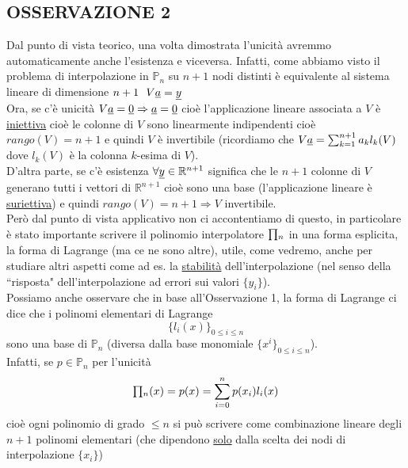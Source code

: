 \subsection{OSSERVAZIONE 2}
Dal punto di vista teorico, una volta dimostrata l'unicità avremmo automaticamente
anche l'esistenza e viceversa. Infatti, come abbiamo visto il problema di interpolazione in $\mathbb{P}_n$ su $n+1$ nodi distinti è equivalente al sistema lineare di dimensione $n+1 \ \ V\uline{a} = \uline{y}$\\
Ora, se c'è unicità $V\uline{a} = \uline{0} \Rightarrow \uline{a} = \uline{0}$ cioè l'applicazione lineare associata a $V$ è \uline{iniettiva} cioè le colonne di $V$ sono linearmente indipendenti cioè $rango(V)=n+1$ e quindi $V$ è invertibile (ricordiamo che $V \uline{a} = \sum_{k=1}^{n+1} a_k l_k(V)$ dove $l_k(V)$ è la colonna $k$-esima di $V$).\\
D'altra parte, se c'è esistenza $\forall \uline{y} \in \mathbb{R}^{n+1}$ significa che le $n+1$ colonne di $V$ generano tutti i vettori di $\mathbb{R}^{n+1}$ cioè sono una base (l'applicazione lineare è \uline{suriettiva}) e quindi $rango(V)=n+1 \Rightarrow V$ invertibile.\\
Però dal punto di vista applicativo non ci accontentiamo di questo, in particolare è stato importante scrivere il polinomio interpolatore $\begin{matrix}\prod\end{matrix}_n$ in una forma esplicita, la forma di Lagrange (ma ce ne sono altre), utile, come vedremo, anche per studiare altri aspetti come ad es. la \uline{stabilità} dell'interpolazione (nel
senso della ``risposta" dell'interpolazione ad errori sui valori $\{y_i\}$).\\
Possiamo anche osservare che in base all'Osservazione 1, la forma di Lagrange ci dice che i polinomi elementari di Lagrange
\[ \{l_i(x)\}_{0 \le i \le n} \]
sono una base di $\mathbb{P}_n$ (diversa dalla base monomiale $\{x^i\}_{0 \le i \le n}$). \\
Infatti, se $p \in \mathbb{P}_n$ per l'unicità
\[\begin{matrix}\prod\end{matrix}_n(x) = p(x) = \sum_{i=0}^n p(x_i) l_i(x)\]
cioè ogni polinomio di grado $\le n$ si può scrivere come combinazione lineare degli $n+1$ polinomi elementari
(che dipendono \uline{solo} dalla scelta dei nodi di interpolazione $\{x_i\}$)


